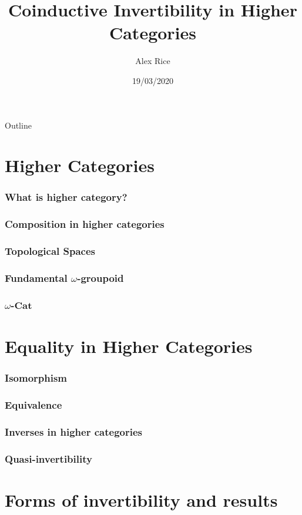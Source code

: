 \documentclass[presentation]{beamer}
\author{Alex Rice}
\date{19/03/2020}
\title{Coinductive Invertibility in Higher Categories}
\begin{document}
\maketitle
\begin{frame}{Outline}
\tableofcontents
\end{frame}

\section{Higher Categories}

\begin{frame}
  \frametitle{What is higher category?}

\end{frame}

\begin{frame}
  \frametitle{Composition in higher categories}
\end{frame}

\begin{frame}
  \frametitle{Topological Spaces}
\end{frame}

\begin{frame}
  \frametitle{Fundamental \(\omega\)-groupoid}
\end{frame}

\begin{frame}
  \frametitle{\(\omega\)-\(\mathbf{Cat}\)}
\end{frame}

\section{Equality in Higher Categories}

\begin{frame}
  \frametitle{Isomorphism}
\end{frame}

\begin{frame}
  \frametitle{Equivalence}
\end{frame}

\begin{frame}
  \frametitle{Inverses in higher categories}
\end{frame}

\begin{frame}
  \frametitle{Quasi-invertibility}
\end{frame}

\section{Forms of invertibility and results}
\end{document}
